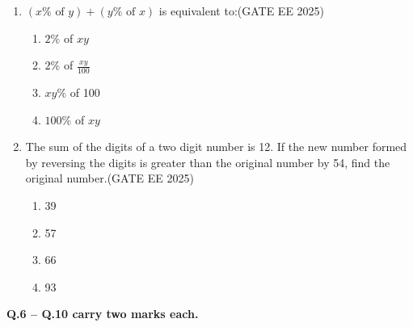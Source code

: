 \begin{enumerate}
\begin{quote}
\underline{\hspace{3cm}} \quad \underline{\hspace{3cm}} \quad is a will, \quad \underline{\hspace{3cm}} \quad is a way.
\end{quote}
\hfill {(GATE EE 2025)}
\begin{multicols}{2}
\begin{enumerate}
\item Wear, there, their
\item Were, their, there
\item Where, there, there
\item Where, their, their
\end{enumerate}
\end{multicols}



\item $(x \% \text{ of } y) + (y \% \text{ of } x)$ is equivalent to:\hfill {(GATE EE 2025)}

\begin{multicols}{2}
\begin{enumerate}
\item $2 \%$ of $xy$
\item $2 \%$ of $\frac{xy}{100}$
\item $xy \%$ of 100
\item $100 \%$ of $xy$
\end{enumerate}
\end{multicols}



\item The sum of the digits of a two digit number is 12. If the new number formed by reversing the digits is greater than the original number by 54, find the original number.\hfill {(GATE EE 2025)}

\begin{multicols}{2}
\begin{enumerate}
\item 39
\item 57
\item 66
\item 93
\end{enumerate}

\end{multicols}

\end{enumerate}


\noindent \textbf{Q.6 -- Q.10 carry two marks each.}

